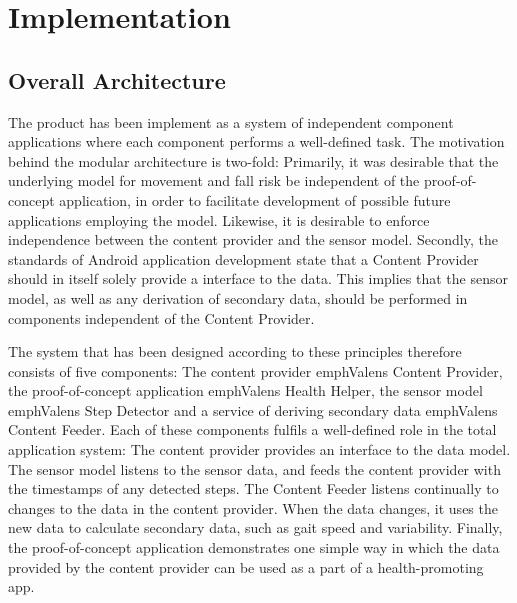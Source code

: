 \chapter{Implementation}


\section{Overall Architecture}
The product has been implement as a system of independent component applications where each component performs a well-defined task. The motivation behind the modular architecture is two-fold: Primarily, it was desirable that the underlying model for movement and fall risk be independent of the proof-of-concept application, in order to facilitate development of possible future applications employing the model. Likewise, it is desirable to enforce independence between the content provider and the sensor model. Secondly, the standards of Android application development state that a Content Provider should in itself solely provide a interface to the data. This implies that the sensor model, as well as any derivation of secondary data, should be performed in components independent of the Content Provider.

The system that has been designed according to these principles therefore consists of five components: The content provider emph{Valens Content Provider}, the proof-of-concept application emph{Valens Health Helper}, the sensor model emph{Valens Step Detector} and a service of deriving secondary data emph{Valens Content Feeder}. Each of these components fulfils a well-defined role in the total application system: The content provider provides an interface to the data model. The sensor model listens to the sensor data, and feeds the content provider with the timestamps of any detected steps. The Content Feeder listens continually to changes to the data in the content provider. When the data changes, it uses the new data to calculate secondary data, such as gait speed and variability. Finally, the proof-of-concept application demonstrates one simple way in which the data provided by the content provider can be used as a part of a health-promoting app.

